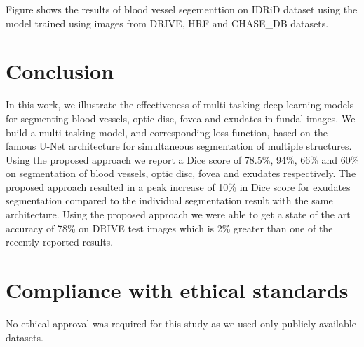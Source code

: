 \documentclass{article}
\begin{document}
Figure shows the results of blood vessel segementtion on IDRiD dataset using the model trained using images from  DRIVE, HRF and CHASE\_DB datasets.


\section{Conclusion}
In this work, we illustrate the effectiveness of multi-tasking deep learning models for segmenting blood vessels, optic disc, fovea and exudates in fundal images. We build a multi-tasking model, and corresponding loss function,  based on the famous U-Net architecture for simultaneous  segmentation of multiple structures. Using the proposed approach we report a Dice score of 78.5\%, 94\%, 66\% and 60\% on segmentation of blood vessels, optic disc, fovea and exudates respectively.
The proposed approach resulted in  a peak increase of 10\% in Dice score for exudates segmentation compared to the individual segmentation result with the same architecture. Using the proposed approach we were able to get a state of the art accuracy of 78\% on DRIVE test images which is 2\% greater than one of the recently reported results.

\section{Compliance with ethical standards}
\label{sec:ethics}
No ethical approval was required for this study as we used only publicly available datasets.


\end{document}
